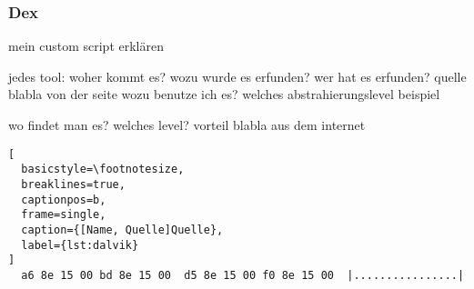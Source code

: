 \subsubsection{Dex}\label{subsubsection:tools-dex}
mein custom script erklären

jedes tool:\newline
woher kommt es?\newline
wozu wurde es erfunden?\newline
wer hat es erfunden? quelle\newline
blabla von der seite\newline
wozu benutze ich es?\newline
welches abstrahierungslevel\newline
beispiel\newline


wo findet man es?\newline
welches level?\newline
vorteil\newline
blabla aus dem internet\newline



\begin{lstlisting}[
  basicstyle=\footnotesize,
  breaklines=true,
  captionpos=b,
  frame=single,
  caption={[Name, Quelle]Quelle},
  label={lst:dalvik}
]
  a6 8e 15 00 bd 8e 15 00  d5 8e 15 00 f0 8e 15 00  |................|
\end{lstlisting}
